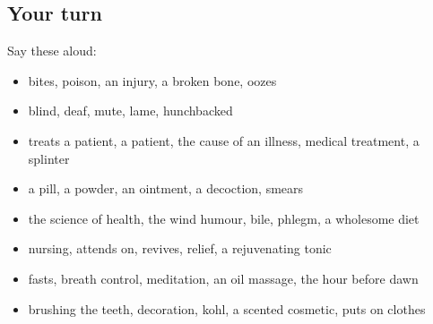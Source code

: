 \subsection*{Your turn}
Say these aloud:

\begin{itemize}
\raggedright
  \item bites, poison, an injury, a broken bone, oozes
  \item blind, deaf, mute, lame, hunchbacked
  \item treats a patient, a patient, the cause of an illness, medical treatment, a splinter
  \item a pill, a powder, an ointment, a decoction, smears
  \item the science of health, the wind humour, bile, phlegm, a wholesome diet
  \item nursing, attends on, revives, relief, a rejuvenating tonic
  \item fasts, breath control, meditation, an oil massage, the hour before dawn
  \item brushing the teeth, decoration, kohl, a scented cosmetic, puts on clothes
\end{itemize}

